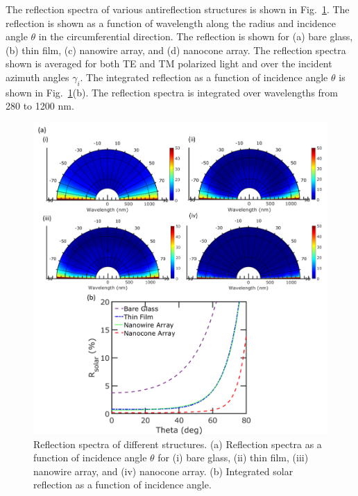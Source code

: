 \documentclass[preprint,12pt]{elsarticle}
\begin{document}
The reflection spectra of various antireflection structures is shown in 
Fig.~\ref{fig:ARspectra}.
The reflection is shown as a function of wavelength along the radius and incidence angle $\theta$ in the circumferential direction.  The reflection is shown for (a) bare glass, (b) thin film, (c) nanowire array, and (d) nanocone array.  
The reflection spectra shown is averaged for both TE and TM polarized light and over the incident azimuth angles $\gamma_i$.
The integrated reflection as a function of incidence angle $\theta$ is shown in 
Fig.~\ref{fig:ARspectra}(b).  The reflection spectra is integrated over wavelengths from 280 to 1200 nm.  

\begin{figure}[H]
\vspace{-10pt}
 \centering
 \includegraphics[width=13.5cm]{./Figures/figure2.png}
\caption{Reflection spectra of different structures.  (a) Reflection spectra as a function of incidence angle $\theta$ for (i) bare glass, (ii) thin film, (iii) nanowire array, and (iv) nanocone array.  
(b) Integrated solar reflection as a function of incidence angle.}
 \label{fig:ARspectra}
 \end{figure}
\end{document}
